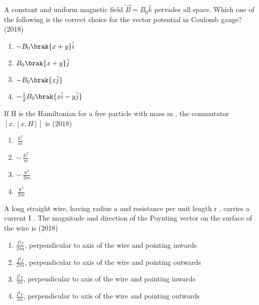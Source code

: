 
\iffalse
\chapter{2018}
\author{AI24BTECH11008}
\section{ph}
\fi

    \item A constant and uniform magnetic field $\overrightarrow{B}=B_0\hat{k}$ pervades all space. Which one of the
    following is the correct choice for the vector potential in Coulomb gauge? \hfill (2018)
    \begin{enumerate}[label = (\Alph*)]
        \item $-B_0\brak{x+y}\hat{i}$
        \item $B_0\brak{x+y}\hat{j}$
        \item $-B_0\brak{x\hat{j}}$
        \item $-\frac{1}{2}B_0\brak{x\hat{i}-y\hat{j}}$       
    \end{enumerate}
    \item If H is the Hamiltonian for a free particle with mass m , the commutator $[x,[x,H]]$ is \hfill (2018)
    \begin{enumerate}[label = (\Alph*)]
        \item $\frac{\hslash ^2}{m}$
        \item $-\frac{\hslash ^2}{m}$
        \item $-\frac{\hslash ^2}{2m}$
        \item $\frac{\hslash ^2}{2m}$
    \end{enumerate}
    \item  A long straight wire, having radius a and resistance per unit length r , carries a current
    I . The magnitude and direction of the Poynting vector on the surface of the wire is \hfill (2018)
    \begin{enumerate}[label = (\Alph*)]
        \item $\frac{I^2r}{2\pi a}$, perpendicular to axis of the wire and pointing inwards
        \item $\frac{I^2r}{2\pi a}$, perpendicular to axis of the wire and pointing outwards
        \item  $\frac{I^2r}{\pi a}$, perpendicular to axis of the wire and pointing inwards
        \item  $\frac{I^2r}{\pi a}$, perpendicular to axis of the wire and pointing outwards 
    \end{enumerate}

